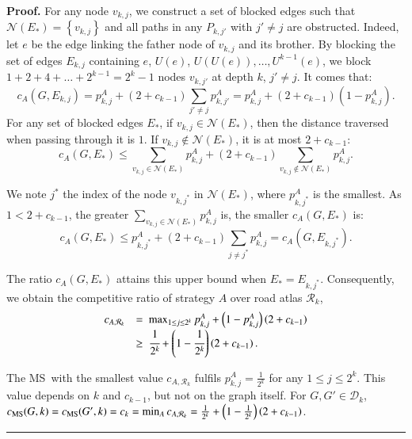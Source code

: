 \documentclass[preprint]{elsarticle}
\newenvironment{proof}[1][Proof]{\textbf{#1.} }{\ \rule{0.5em}{0.5em}}
\newcommand{\set}[1]{\left\{ #1 \right\}}
\newcommand{\mcalr}{\mathcal{R}}
\newcommand{\mcald}{\mathcal{D}}
\newcommand{\mcaln}{\mathcal{N}}
\newcommand{\mts}{MS}
\newcommand{\cms}{c_{\mbox{\scriptsize{MS}}}}
\begin{document}
\begin{proof}
For any node $v_{k,j}$, we construct a set of blocked edges such that $\mcaln(E_*) = \set{v_{k,j}}$ and all paths in any $P_{k,j'}$ with $j' \neq j$ are obstructed. Indeed, let $e$ be the edge linking the father node of $v_{k,j}$ and its brother. By blocking the set of edges $E_{k,j}$ containing $e$,  $U(e)$, $U(U(e)),\ldots, U^{k-1}(e)$, we block $1+2+4+\ldots+2^{k-1} = 2^k - 1$ nodes $v_{k,j'}$ at depth $k$, $j' \neq j$. 
It comes that:
\[
c_A(G, E_{k,j}) = p_{k,j}^A + (2+c_{k-1})\sum_{j' \neq j}p_{k,j'}^A = p_{k,j}^A + (2+c_{k-1})(1-p_{k,j}^A).
\]
For any set of blocked edges $E_*$, if $v_{k,j} \in \mcaln(E_*)$, then the distance traversed when passing through it is $1$. If $v_{k,j} \notin \mcaln(E_*)$, it is at most $2 + c_{k-1}$:
\[
c_A(G, E_*) \leq \sum_{v_{k,j}\in \mcaln(E_*)} p_{k,j}^A+  (2+c_{k-1})\sum_{v_{k,j}\notin \mcaln(E_*)}p_{k,j}^A.
\]

We note $j^*$ the index of the node $v_{k,j^*}$ in $\mcaln\left(E_*\right)$, where $p_{k,j^*}^A$ is the smallest. As $1 < 2 + c_{k-1}$, the greater $\sum_{v_{k,j}\in \mcaln(E_*)} p_{k,j}^A$ is, the smaller $c_A(G, E_*)$ is:
\[
c_A(G, E_*) \le p_{k,j^*}^A + (2+c_{k-1})\sum_{j\neq j^*}p_{k,j}^A = c_A(G, E_{k,j^*}).
\] 

The ratio $c_A(G, E_*)$ attains this upper bound when $E_* = E_{k,j^*}$. Consequently, we obtain the competitive ratio of strategy $A$ over road atlas $\mcalr_k$,
\[
\begin{array}{rl}
c_{A,\mcalr_k} & =  ~\max_{1 \le j \le 2^k} p_{k,j}^{A} + \left(1-p_{k,j}^{A}\right)\left(2+c_{k-1}\right)\\
& \geq ~\cfrac{1}{2^k} + \left(1-\cfrac{1}{2^k}\right)\left(2+c_{k-1}\right).
\end{array}
\]

The \mts ~with the smallest value $c_{A,\mcalr_k}$ fulfils $p_{k,j}^A = \frac{1}{2^k}$ for any $1 \le j \le 2^k$. This value depends on $k$ and $c_{k-1}$, but not on the graph itself. For $G,G' \in \mcald_k$, $\cms(G,k) = \cms(G',k) = c_k = \min_{A} c_{A,\mcalr_k} = \frac{1}{2^k} + \left(1-\frac{1}{2^k}\right)\left(2+c_{k-1}\right)$.
\end{proof}
\end{document}
